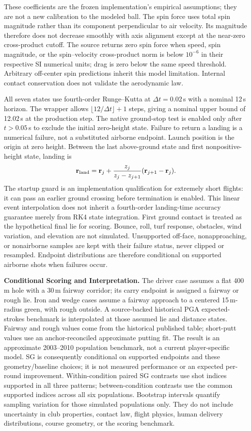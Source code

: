 \documentclass[11pt,letterpaper]{article}
\begin{document}
These coefficients are the frozen implementation's empirical assumptions;
they are not a new calibration to the modeled ball. The spin force uses total
spin magnitude rather than its component perpendicular to air velocity.
Its magnitude therefore does not decrease smoothly with axis alignment except
at the near-zero cross-product cutoff. The source returns zero spin force
when speed, spin magnitude, or the spin--velocity cross-product norm is below
$10^{-6}$ in their respective SI numerical units; drag is zero below the same
speed threshold. Arbitrary off-center spin predictions inherit this model
limitation. Internal contact conservation does not validate the aerodynamic law.

All seven states use fourth-order Runge--Kutta at $\Delta t=0.02$\,s with a
nominal 12\,s horizon. The wrapper allows $\lfloor12/\Delta t\rfloor+1$
steps, giving a nominal upper bound of 12.02\,s at the production step.
The native ground-stop test is enabled only after $t>0.05$\,s to exclude the
initial zero-height state. Failure to return a landing is a numerical failure,
not a substituted airborne endpoint. Launch position is the origin at zero
height. Between the last
above-ground state and first nonpositive-height state, landing is
\[
 \mathbf r_{\rm land}=\mathbf r_j+
 \frac{z_j}{z_j-z_{j+1}}(\mathbf r_{j+1}-\mathbf r_j).
\]
The startup guard is an implementation qualification for extremely short
flights: it can pass an earlier ground crossing before termination is enabled.
This linear event interpolation does not inherit a fourth-order landing-time
accuracy guarantee merely from RK4 state integration. First ground contact is
treated as the hypothetical final lie for scoring. Bounce, roll, turf response,
obstacles, wind variation, and elevation are not simulated.
Unsupported off-face, nonapproaching, or nonairborne samples are kept with
their failure status, never clipped or resampled. Endpoint distributions are
therefore conditional on supported airborne shots when failures occur.

\textbf{Conditional Scoring and Interpretation.} The driver case assumes a
flat 400\,m hole with a 30\,m fairway corridor; its carry endpoint is assigned
a fairway or rough lie. Iron and wedge cases assume a fairway approach to a
centered 15\,m-radius green, with rough outside. A source-backed historical
PGA expected-strokes benchmark is interpolated at those assumed lie and
distance states. Fairway and rough values come from the historical published
table; short-putt values use an anchor-reconciled approximate putting fit. The
result is an approximate 2003--2010 population benchmark, not a current
player-specific model. SG is consequently conditional on supported
endpoints and these geometry/baseline choices; it is not measured performance
or an expected per-round improvement. Within-condition paired SG contrasts
use shot indices supported in all three patterns; between-condition contrasts
use the common supported indices across all six populations. Bootstrap
intervals quantify sampling variation for those simulated populations only. They do not include uncertainty
in club properties, contact law, flight physics, human delivery distributions,
course geometry, or the scoring benchmark.
\end{document}
